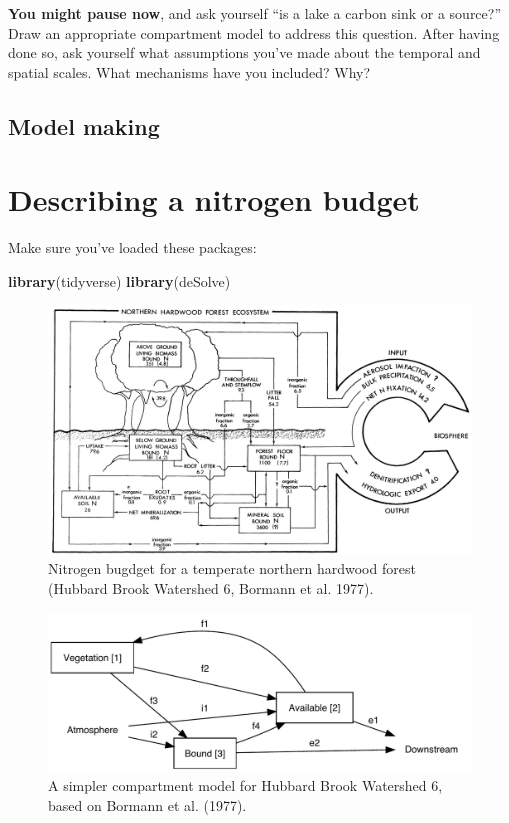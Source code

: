 \documentclass[
]{book}
\newenvironment{Shaded}{\begin{snugshade}}{\end{snugshade}}
\newcommand{\KeywordTok}[1]{\textcolor[rgb]{0.13,0.29,0.53}{\textbf{#1}}}
\newcommand{\NormalTok}[1]{#1}
\begin{document}
\textbf{You might pause now}, and ask yourself ``is a lake a carbon sink or a source?'' Draw an appropriate compartment model to address this question. After having done so, ask yourself what assumptions you've made about the temporal and spatial scales. What mechanisms have you included? Why?

\hypertarget{model-making}{%
\section{Model making}\label{model-making}}

\hypertarget{describing-a-nitrogen-budget}{%
\chapter{Describing a nitrogen budget}\label{describing-a-nitrogen-budget}}

Make sure you've loaded these packages:

\begin{Shaded}
\begin{Highlighting}[]
\KeywordTok{library}\NormalTok{(tidyverse)}
\KeywordTok{library}\NormalTok{(deSolve)}
\end{Highlighting}
\end{Shaded}

\begin{figure}
\includegraphics[width=1\linewidth]{figs/BormannF2} \caption{Nitrogen bugdget for a temperate northern hardwood forest (Hubbard Brook Watershed 6, Bormann et al. 1977).}\label{fig:hbnb}
\end{figure}

\begin{figure}
\includegraphics[width=0.9\linewidth]{figs/model3} \caption{A simpler compartment model for Hubbard Brook Watershed 6, based on Bormann et al. (1977).}\label{fig:hbnb3}
\end{figure}
\end{document}
